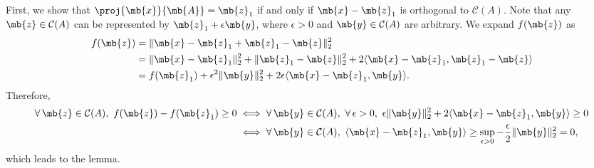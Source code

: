 \begin{exercise}[Projection ]
\begin{enumerate}
            \begin{solution}   
                First, we show that $\proj{\mb{x}}{\mb{A}}=\mb{z}_1$ if and only if $\mb{x}-\mb{z}_1$ is orthogonal to $\mathcal{C}(A)$.
                Note that any $\mb{z}\in\mathcal{C}(A)$ can be represented by $\mb{z}_1+\epsilon\mb{y}$, where $\epsilon>0$ and $\mb{y}\in\mathcal{C}(A)$ are arbitrary. We expand $f(\mb{z})$ as
                \begin{align*}
                    f(\mb{z}) 
                     & = \|\mb{x}-\mb{z}_1+\mb{z}_1-\mb{z}\|^2_2                                                             \\
                     & = \|\mb{x}-\mb{z}_1\|^2_2 + \|\mb{z}_1-\mb{z}\|^2_2 + 2\langle\mb{x}-\mb{z}_1, \mb{z}_1-\mb{z}\rangle \\
                     & = f(\mb{z}_1) + \epsilon^2\|\mb{y}\|^2_2 + 2\epsilon\langle\mb{x}-\mb{z}_1, \mb{y}\rangle.
                \end{align*}
                Therefore,
                \begin{align*}
                    \forall \,\mb{z}\in\mathcal{C}(A),\ f(\mb{z})-f(\mb{z}_1) \ge 0 
                     & \iff \forall \,\mb{y}\in\mathcal{C}(A),\ \forall \,\epsilon>0,\ \epsilon\|\mb{y}\|^2_2 + 2\langle\mb{x}-\mb{z}_1, \mb{y}\rangle \ge 0        \\
                     & \iff \forall \,\mb{y}\in\mathcal{C}(A),\  \langle\mb{x}-\mb{z}_1, \mb{y}\rangle \ge \sup_{\epsilon>0}-\frac{\epsilon}{2}\|\mb{y}\|^2_2 = 0,
                \end{align*}
                which leads to the lemma.

\end{solution}
\end{enumerate}
\end{exercise}

